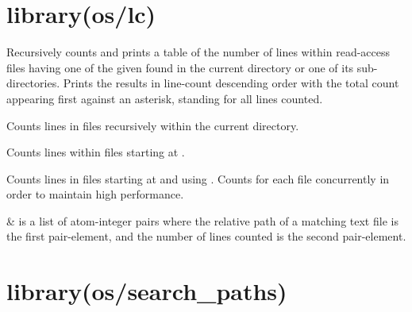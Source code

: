 \chapter{library(os/lc)}\label{sec:lc}

\begin{description}
Recursively counts and prints a table of the number of lines within
read-access files having one of the given  found in the
current directory or one of its sub-directories. Prints the results
in line-count descending order with the total count appearing first
against an asterisk, standing for all lines counted.

Counts lines in files recursively within the current directory.

Counts lines within files starting at .

Counts lines in files starting at  and using .
Counts for each file concurrently in order to maintain high
performance.

\begin{arguments}
 & is a list of atom-integer pairs where the relative path
of a matching text file is the first pair-element, and the number of
lines counted is the second pair-element. \\
\end{arguments}
\end{description}

\chapter{library(os/search_paths)}\label{sec:searchpaths}

